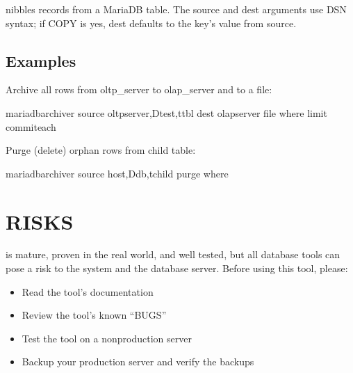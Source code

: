 \documentclass[letterpaper,10pt,english]{sphinxmanual}
\begin{document}
\sphinxAtStartPar
{} nibbles records from a MariaDB table.  The \textendash{}source and \textendash{}dest
arguments use DSN syntax; if COPY is yes, \textendash{}dest defaults to the key’s value
from \textendash{}source.


\subsection{Examples}
\label{\detokenize{mariadb-archiver:examples}}
\sphinxAtStartPar
Archive all rows from oltp\_server to olap\_server and to a file:

\begin{sphinxVerbatim}[commandchars=\\\{\}]
mariadb\PYGZhy{}archiver \PYGZhy{}\PYGZhy{}source oltp\PYGZus{}server,Dtest,ttbl \PYGZhy{}\PYGZhy{}dest olap\PYGZus{}server 
  \PYGZhy{}\PYGZhy{}file                            
  \PYGZhy{}\PYGZhy{}where  \PYGZhy{}\PYGZhy{}limit  \PYGZhy{}\PYGZhy{}commit\PYGZhy{}each
\end{sphinxVerbatim}

\sphinxAtStartPar
Purge (delete) orphan rows from child table:

\begin{sphinxVerbatim}[commandchars=\\\{\}]
mariadb\PYGZhy{}archiver \PYGZhy{}\PYGZhy{}source host,Ddb,tchild \PYGZhy{}\PYGZhy{}purge 
  \PYGZhy{}\PYGZhy{}where 
\end{sphinxVerbatim}


\section{RISKS}
\label{\detokenize{mariadb-archiver:risks}}
\sphinxAtStartPar
{} is mature, proven in the real world, and well tested,
but all database tools can pose a risk to the system and the database
server.  Before using this tool, please:
\begin{itemize}
\item {} 
\sphinxAtStartPar
Read the tool’s documentation

\item {} 
\sphinxAtStartPar
Review the tool’s known “BUGS”

\item {} 
\sphinxAtStartPar
Test the tool on a non\sphinxhyphen{}production server

\item {} 
\sphinxAtStartPar
Backup your production server and verify the backups

\end{itemize}
\end{document}
